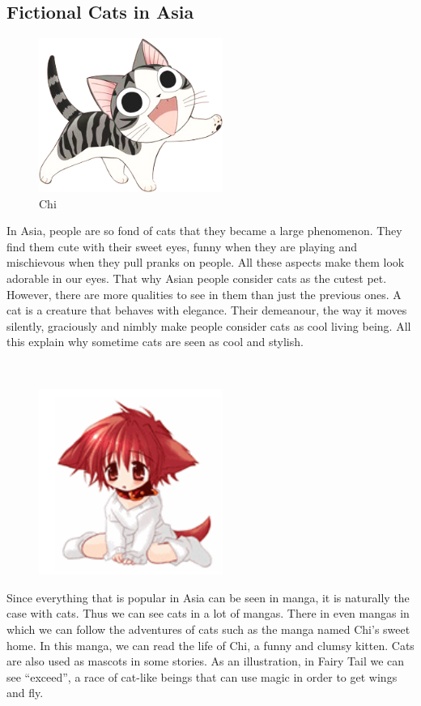\documentclass[a0,portrait,20pt]{a0poster}
\begin{document}
\begin{multicols}{2}
\color{DarkSlateGray} %

\section*{Fictional Cats in Asia}

\begin{figure}\includegraphics[width=6cm]{a1.png}\caption{Chi}\end{figure}
In Asia, people are so fond of cats that they became a large phenomenon. They find them cute with their sweet eyes, funny when they are playing and mischievous when they pull pranks on people. All these aspects make them look adorable in our eyes. That why Asian people consider cats as the cutest pet. However, there are more qualities to see in them than just the previous ones. A cat is a creature that behaves with elegance. Their demeanour, the way it moves silently, graciously and nimbly make people consider cats as cool living being. All this explain why sometime cats are seen as cool and stylish.

~

\begin{figure}\includegraphics[width=6cm]{a2.png}\end{figure}
Since everything that is popular in Asia can be seen in manga, it is naturally the case with cats. Thus we can see cats in a lot of mangas. There in even mangas in which we can follow the adventures of cats such as the manga named Chi’s sweet home. In this manga, we can read the life of Chi, a funny and clumsy kitten. Cats are also used as mascots in some stories. As an illustration, in Fairy Tail we can see “exceed”, a race of cat-like beings that can use magic in order to get wings and fly.


\end{multicols}
\end{document}
